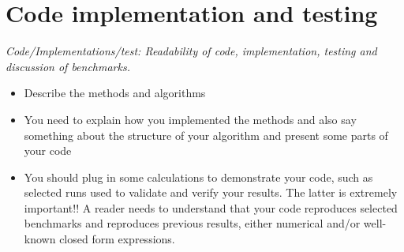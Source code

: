 \section{Code implementation and testing}
\label{code_imp}

\textit{Code/Implementations/test: Readability of code, implementation, testing and discussion of benchmarks.}
\begin{itemize}
    \item Describe the methods and algorithms
    \item You need to explain how you implemented the methods and also say something about the structure of your algorithm and present some parts of your code
    \item You should plug in some calculations to demonstrate your code, such as selected runs used to validate and verify your results. The latter is extremely important!! A reader needs to understand that your code reproduces selected benchmarks and reproduces previous results, either numerical and/or well-known closed form expressions.
\end{itemize}




